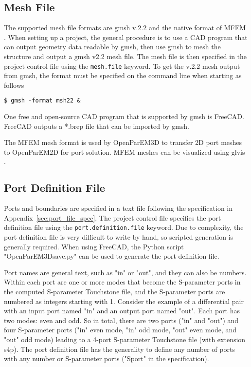 \documentclass[titlepage]{article}
\renewcommand\_{\textunderscore\linebreak[1]}
\begin{document}
\subsection{Mesh File}

The supported mesh file formats are gmsh v.2.2 and the native format of MFEM \cite{MFEM}\cite{MFEMweb}.  When setting up a project, the general procedure is to use a CAD program that can output geometry data readable by gmsh, then use gmsh to mesh the structure and output a gmsh v2.2 mesh file.  The mesh file is then specified in the project control file using the \texttt{mesh.file} keyword.  To get the v.2.2 mesh output from gmsh, the format must be specified on the command line when starting as follows
\begin{Verbatim}[fontsize=\small]
   $ gmsh -format msh22 &
\end{Verbatim}
\noindent One free and open-source CAD program that is supported by gmsh is FreeCAD.  FreeCAD outputs a *.brep file that can be imported by gmsh.

The MFEM mesh format is used by OpenParEM3D to transfer 2D port meshes to OpenParEM2D for port solution. MFEM meshes can be visualized using glvis \cite{glvis}.  

\subsection{Port Definition File}
\label{sec:port_definition_file}

Ports and boundaries are specified in a text file following the specification in Appendix~\ref{sec:port_file_spec}.  The project control file specifies the port definition file using the \texttt{port.definition.file} keyword. Due to complexity, the port definition file is very difficult to write by hand, so scripted generation is generally required.  When using FreeCAD, the Python script "OpenParEM3D\_save.py" can be used to generate the port definition file.

Port names are general text, such as "in" or "out", and they can also be numbers. Within each port are one or more modes that become the S-parameter ports in the computed S-parameter Touchstone\textsuperscript{\textregistered} \cite{IBIS} file, and the S-parameter ports are numbered as integers starting with 1. Consider the example of a differential pair with an input port named "in" and an output port named "out". Each port has two modes: even and odd.  So in total, there are two ports ("in" and "out") and four S-parameter ports ("in" even mode, "in" odd mode, "out" even mode, and "out" odd mode) leading to a 4-port S-parameter Touchstone file (with extension s4p). The port definition file has the generality to define any number of ports with any number or S-parameter ports ("Sport" in the specification).
\end{document}
